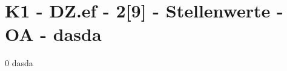 \section{K1 - DZ.ef - 2[9] - Stellenwerte - OA - dasda}

\begin{langesbeispiel}\item[0] %
dasda

\end{langesbeispiel}